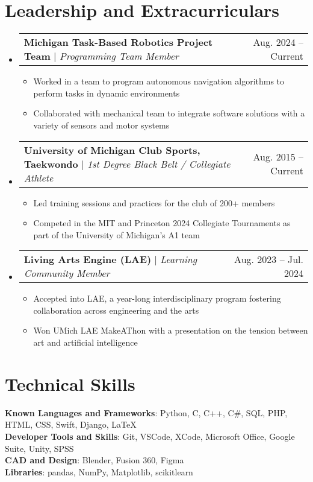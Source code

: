 \documentclass[letterpaper,11pt]{article}
\makeatletter
\newcommand{\resumeItem}[1]{
  \item\small{
    {#1 \vspace{-2.5pt}}
  }
}
\newcommand{\resumeProjectHeading}[2]{
    \item
    \begin{tabular*}{.98\textwidth}{l@{\extracolsep{\fill}}r}
      \small#1 & #2 \\
    \end{tabular*}\vspace{-7pt}
}
\newcommand{\resumeSubHeadingListStart}{\begin{itemize}[leftmargin=0in, label={}]}
\newcommand{\resumeSubHeadingListEnd}{\end{itemize}}
\newcommand{\resumeItemListStart}{\begin{itemize}}
\newcommand{\resumeItemListEnd}{\end{itemize}\vspace{-6pt}}
\makeatother
\begin{document}
\section{Leadership and Extracurriculars} 
    \resumeSubHeadingListStart
        \resumeProjectHeading
          {\textbf{Michigan Task-Based Robotics Project Team} $|$ \emph{Programming Team Member}}{Aug. 2024 -- Current}
          \resumeItemListStart
            \resumeItem{Worked in a team to program autonomous navigation algorithms to perform tasks in dynamic environments}
            \resumeItem{Collaborated with mechanical team to integrate software solutions with a variety of sensors and motor systems}
          \resumeItemListEnd

        \resumeProjectHeading
          {\textbf{University of Michigan Club Sports, Taekwondo} $|$ \emph{1st Degree Black Belt / Collegiate Athlete}}{Aug. 2015 -- Current}
          \resumeItemListStart
            \resumeItem{Led training sessions and practices for the club of 200+ members}
            \resumeItem{Competed in the MIT and Princeton 2024 Collegiate Tournaments as part of the University of Michigan's A1 team}
          \resumeItemListEnd

        \resumeProjectHeading
          {\textbf{Living Arts Engine (LAE)} $|$ \emph{Learning Community Member}}{Aug. 2023 -- Jul. 2024}
          \resumeItemListStart
            \resumeItem{Accepted into LAE, a year-long interdisciplinary program fostering collaboration across engineering and the arts}
            \resumeItem{Won UMich LAE MakeAThon with a presentation on the tension between art and artificial intelligence}
          \resumeItemListEnd

    \resumeSubHeadingListEnd

%
\section{Technical Skills}
 \begin{itemize}[leftmargin=0.15in, label={}]
    \small{\item{
     \textbf{Known Languages and Frameworks}{: Python, C, C++, C\#, SQL, PHP, HTML, CSS, Swift, Django, LaTeX} \\
     \textbf{Developer Tools and Skills}{: Git, VSCode, XCode, Microsoft Office, Google Suite, Unity, SPSS} \\
     \textbf{CAD and Design}{: Blender, Fusion 360, Figma} \\
     \textbf{Libraries}{: pandas, NumPy, Matplotlib, scikitlearn} \\ }
     }
 \end{itemize}


\end{document}

